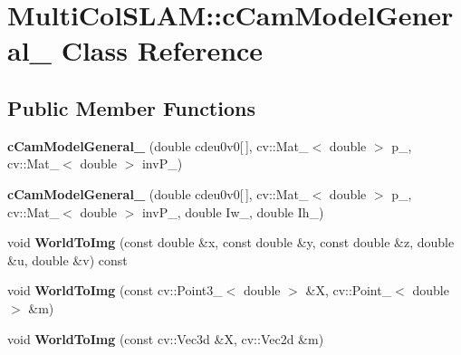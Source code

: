 \hypertarget{classMultiColSLAM_1_1cCamModelGeneral__}{}\section{Multi\+Col\+S\+L\+AM\+:\+:c\+Cam\+Model\+General\+\_\+ Class Reference}
\label{classMultiColSLAM_1_1cCamModelGeneral__}
\subsection*{Public Member Functions}
\begin{DoxyCompactItemize}
\item 
{\bfseries c\+Cam\+Model\+General\+\_\+} (double cdeu0v0\mbox{[}$\,$\mbox{]}, cv\+::\+Mat\+\_\+$<$ double $>$ p\+\_\+, cv\+::\+Mat\+\_\+$<$ double $>$ inv\+P\+\_\+)\hypertarget{classMultiColSLAM_1_1cCamModelGeneral___ab14c20bc25f0405247e4925cc58844a3}{}\label{classMultiColSLAM_1_1cCamModelGeneral___ab14c20bc25f0405247e4925cc58844a3}

\item 
{\bfseries c\+Cam\+Model\+General\+\_\+} (double cdeu0v0\mbox{[}$\,$\mbox{]}, cv\+::\+Mat\+\_\+$<$ double $>$ p\+\_\+, cv\+::\+Mat\+\_\+$<$ double $>$ inv\+P\+\_\+, double Iw\+\_\+, double Ih\+\_\+)\hypertarget{classMultiColSLAM_1_1cCamModelGeneral___a145abd938627a2d5f0e28cd47b436fa9}{}\label{classMultiColSLAM_1_1cCamModelGeneral___a145abd938627a2d5f0e28cd47b436fa9}

\item 
void {\bfseries World\+To\+Img} (const double \&x, const double \&y, const double \&z, double \&u, double \&v) const \hypertarget{classMultiColSLAM_1_1cCamModelGeneral___a6a507ea61fabd853dee10ea0e2047f91}{}\label{classMultiColSLAM_1_1cCamModelGeneral___a6a507ea61fabd853dee10ea0e2047f91}

\item 
void {\bfseries World\+To\+Img} (const cv\+::\+Point3\+\_\+$<$ double $>$ \&X, cv\+::\+Point\+\_\+$<$ double $>$ \&m)\hypertarget{classMultiColSLAM_1_1cCamModelGeneral___a6e3d31b5b392da4d04283e1812668a97}{}\label{classMultiColSLAM_1_1cCamModelGeneral___a6e3d31b5b392da4d04283e1812668a97}

\item 
void {\bfseries World\+To\+Img} (const cv\+::\+Vec3d \&X, cv\+::\+Vec2d \&m)\hypertarget{classMultiColSLAM_1_1cCamModelGeneral___a4c682786d019d89156ef87574b4bfca0}{}\label{classMultiColSLAM_1_1cCamModelGeneral___a4c682786d019d89156ef87574b4bfca0}


\end{DoxyCompactItemize}
